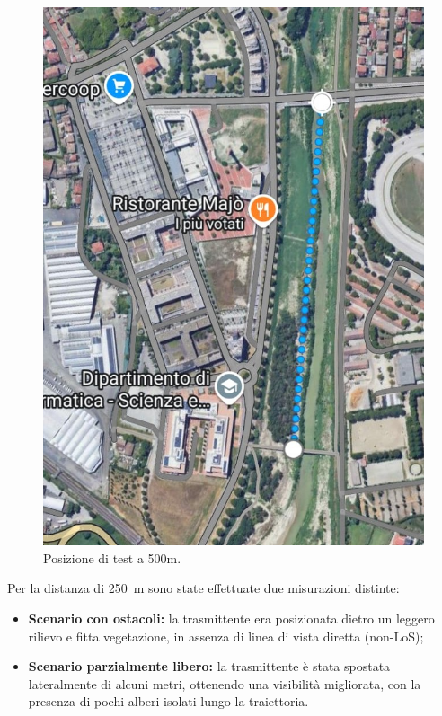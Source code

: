 \documentclass[12pt,a4paper,twoside]{book}
\begin{document}
\begin{figure}[H]
\begin{minipage}{0.32\textwidth}
        \includegraphics[width=\textwidth]{img/tests/T1/sat/500-full.jpeg}
        \caption{Posizione di test a 500m.}
        \label{fig:throughput-test-500m}
    \end{minipage}
\end{figure}

Per la distanza di 250~m sono state effettuate due misurazioni distinte:
\begin{itemize}
    \item \textbf{Scenario con ostacoli:} la trasmittente era posizionata dietro
          un leggero rilievo e fitta vegetazione, in assenza di linea di vista diretta (non-LoS);

    \item \textbf{Scenario parzialmente libero:} la trasmittente è stata spostata
          lateralmente di alcuni metri, ottenendo una visibilità migliorata, con la presenza
          di pochi alberi isolati lungo la traiettoria.
\end{itemize}
\end{document}
